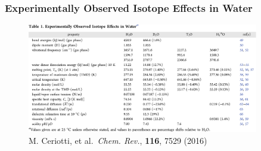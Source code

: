 \begin{frame}
  \frametitle{Experimentally Observed Isotope Effects in Water}
  \begin{figure}
    \centering
    \includegraphics[width=0.9\textwidth]{figs/exp_water_isotope_effects.pdf}
    \caption*{\small M. Ceriotti, et al.\ \textit{Chem. Rev.}, \textbf{116}, 7529 (2016)}
  \end{figure}
\end{frame}
